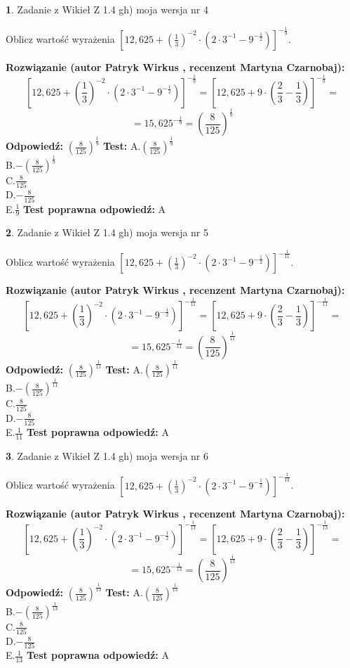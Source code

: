 \documentclass[12pt, a4paper]{article}
\theoremstyle{definition} %
\newtheorem{zad}{}
\newcommand{\zadStart}[1]{\begin{zad}#1\newline}
\newcommand{\zadStop}{\end{zad}}
\newcommand{\rozwStart}[2]{\noindent \textbf{Rozwiązanie (autor #1 , recenzent #2): }\newline}
\newcommand{\rozwStop}{\newline}
\newcommand{\odpStart}{\noindent \textbf{Odpowiedź:}\newline}
\newcommand{\odpStop}{\newline}
\newcommand{\testStart}{\noindent \textbf{Test:}\newline}
\newcommand{\testStop}{\newline}
\newcommand{\kluczStart}{\noindent \textbf{Test poprawna odpowiedź:}\newline}
\newcommand{\kluczStop}{\newline}
\begin{document}
\zadStart{Zadanie z Wikieł Z 1.4 gh) moja wersja nr 4}

Oblicz wartość wyrażenia $[12,625+(\frac{1}{3})^{-2}\cdot(2\cdot 3^{-1} - 9^{-\frac{1}{2}})]^{-\frac{1}{9}}$.
\zadStop
\rozwStart{Patryk Wirkus}{Martyna Czarnobaj}
$$[12,625+(\frac{1}{3})^{-2}\cdot(2\cdot 3^{-1} - 9^{-\frac{1}{2}})]^{-\frac{1}{9}} = [12,625+9\cdot (\frac{2}{3}-\frac{1}{3})]^{-\frac{1}{9}} =$$
$$=15,625^{-\frac{1}{9}} = (\frac{8}{125})^\frac{1}{9}$$
\rozwStop
\odpStart
$(\frac{8}{125})^\frac{1}{9}$
\odpStop
\testStart
A.$(\frac{8}{125})^\frac{1}{9}$\\ B.$-(\frac{8}{125})^\frac{1}{9}$\\ C.$\frac{8}{125}$\\ D.$-\frac{8}{125}$\\ E.$\frac{1}{9}$
\testStop
\kluczStart
A
\kluczStop



\zadStart{Zadanie z Wikieł Z 1.4 gh) moja wersja nr 5}

Oblicz wartość wyrażenia $[12,625+(\frac{1}{3})^{-2}\cdot(2\cdot 3^{-1} - 9^{-\frac{1}{2}})]^{-\frac{1}{11}}$.
\zadStop
\rozwStart{Patryk Wirkus}{Martyna Czarnobaj}
$$[12,625+(\frac{1}{3})^{-2}\cdot(2\cdot 3^{-1} - 9^{-\frac{1}{2}})]^{-\frac{1}{11}} = [12,625+9\cdot (\frac{2}{3}-\frac{1}{3})]^{-\frac{1}{11}} =$$
$$=15,625^{-\frac{1}{11}} = (\frac{8}{125})^\frac{1}{11}$$
\rozwStop
\odpStart
$(\frac{8}{125})^\frac{1}{11}$
\odpStop
\testStart
A.$(\frac{8}{125})^\frac{1}{11}$\\ B.$-(\frac{8}{125})^\frac{1}{11}$\\ C.$\frac{8}{125}$\\ D.$-\frac{8}{125}$\\ E.$\frac{1}{11}$
\testStop
\kluczStart
A
\kluczStop



\zadStart{Zadanie z Wikieł Z 1.4 gh) moja wersja nr 6}

Oblicz wartość wyrażenia $[12,625+(\frac{1}{3})^{-2}\cdot(2\cdot 3^{-1} - 9^{-\frac{1}{2}})]^{-\frac{1}{13}}$.
\zadStop
\rozwStart{Patryk Wirkus}{Martyna Czarnobaj}
$$[12,625+(\frac{1}{3})^{-2}\cdot(2\cdot 3^{-1} - 9^{-\frac{1}{2}})]^{-\frac{1}{13}} = [12,625+9\cdot (\frac{2}{3}-\frac{1}{3})]^{-\frac{1}{13}} =$$
$$=15,625^{-\frac{1}{13}} = (\frac{8}{125})^\frac{1}{13}$$
\rozwStop
\odpStart
$(\frac{8}{125})^\frac{1}{13}$
\odpStop
\testStart
A.$(\frac{8}{125})^\frac{1}{13}$\\ B.$-(\frac{8}{125})^\frac{1}{13}$\\ C.$\frac{8}{125}$\\ D.$-\frac{8}{125}$\\ E.$\frac{1}{13}$
\testStop
\kluczStart
A
\kluczStop
\end{document}
